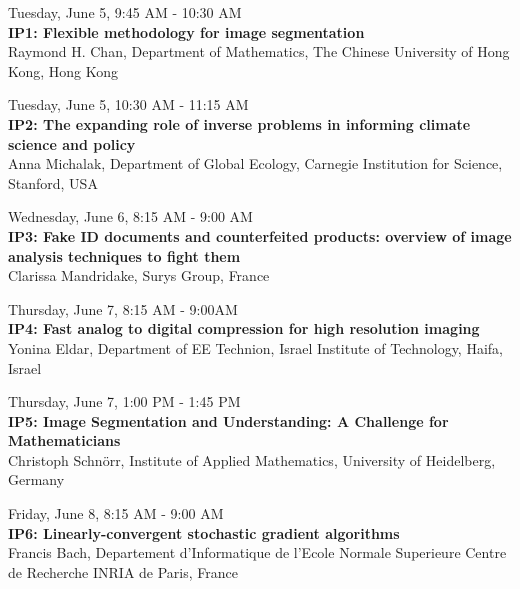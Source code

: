 \begin{center}{\large{
      Tuesday, June 5, 9:45 AM - 10:30 AM \\
      \textbf{IP1: Flexible methodology for image segmentation}\\
Raymond H. Chan, Department of Mathematics, The Chinese University of Hong Kong,  Hong Kong}}\\
\end{center}

\begin{center}{\large{
Tuesday, June 5, 10:30 AM - 11:15 AM \\
\textbf{IP2: The expanding role of inverse problems in informing climate science and policy}\\
Anna Michalak, Department of Global Ecology, Carnegie Institution for Science, Stanford, USA}}\\
\end{center}

\begin{center}{\large{
Wednesday, June 6, 8:15 AM - 9:00 AM \\
\textbf{IP3: Fake ID documents and counterfeited products: overview of image analysis techniques to fight them}\\
Clarissa Mandridake, Surys Group, France}}\\
\end{center}

\begin{center}{\large{
Thursday, June 7, 8:15 AM - 9:00AM \\
\textbf{IP4: Fast analog to digital compression for high resolution imaging}\\
Yonina Eldar, Department of EE Technion, Israel Institute of Technology, Haifa, Israel
}}\\
\end{center}

\begin{center}{\large{
Thursday, June 7, 1:00 PM - 1:45 PM \\
\textbf{IP5: Image Segmentation and Understanding: A Challenge for Mathematicians}\\
Christoph Schn\"{o}rr, Institute of Applied Mathematics, University of Heidelberg, Germany}}\\
\end{center}

\begin{center}{\large{
Friday, June 8, 8:15 AM - 9:00 AM \\
\textbf{IP6: Linearly-convergent stochastic gradient algorithms}\\
Francis Bach, Departement d'Informatique de l'Ecole Normale Superieure Centre de Recherche INRIA de Paris, France}}
\end{center}


